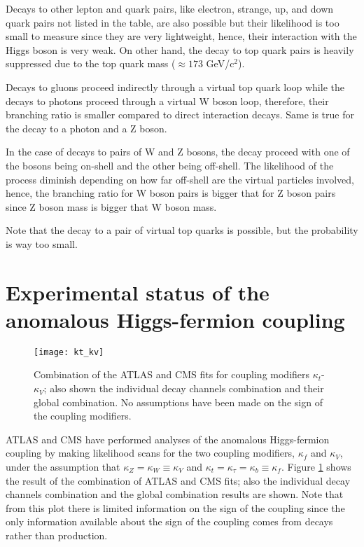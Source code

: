 Decays to other lepton and quark pairs, like electron, strange, up, and down quark pairs not listed in the table, are also possible but their likelihood is too small to measure since they are very lightweight, hence, their interaction with the Higgs boson is very weak. On other hand, the decay to top quark pairs is heavily suppressed due to the top quark mass ($\approx 173$ GeV/c$^2$).

Decays to gluons proceed indirectly through a virtual top quark loop while the decays to photons proceed through a virtual W boson loop, therefore, their branching ratio is smaller compared to direct interaction decays. Same is true for the decay to a photon and a Z boson.

In the case of decays to pairs of W and Z bosons, the decay proceed with one of the bosons being on-shell and the other being off-shell. The likelihood of the process diminish depending on how far off-shell are the virtual particles involved, hence, the branching ratio for W boson pairs is bigger that for Z boson pairs since Z boson mass is bigger that W boson mass.

Note that the decay to a pair of virtual top quarks is possible, but the probability is way too small. 

\section{Experimental status of the anomalous Higgs-fermion coupling}

\begin{figure}[h!]
\centering
\texttt{[image: kt\_kv]}
\caption[$\kappa_t$-$\kappa_V$ plot of the coupling modifiers. ATLAS and CMS combination.]{Combination of the  ATLAS and CMS fits for coupling modifiers $\kappa_t$-$\kappa_V$; also shown the individual decay channels combination and their global combination. No assumptions have been made on the sign of the coupling modifiers\cite{comb_ht_couplings}.} 
\label{fig:kt_kv}
\end{figure}
 
ATLAS and CMS have performed analyses of the anomalous Higgs-fermion coupling by making likelihood scans for the two coupling modifiers, $\kappa_f$ and $\kappa_V$, under the assumption that $\kappa_Z=\kappa_W \equiv \kappa_V$ and $\kappa_t=\kappa_\tau=\kappa_b \equiv\kappa_f$. Figure \ref{fig:kt_kv} shows the result of the combination of ATLAS and CMS fits; also the individual decay channels combination and the global combination results are shown. Note that from this plot there is limited information on the sign of the coupling since the only information available about the sign of the coupling comes from decays rather than production. 

